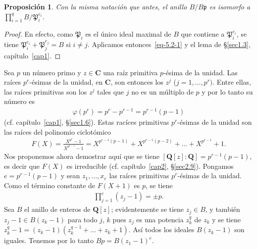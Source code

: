 \documentclass[oneside,bibtotoc,leqno,spanish]{amsbook}
\newcommand{\QQ}{\mathbf{Q}}
\newcommand{\CC}{\mathbf{C}}
\newcommand{\idl}[1]{\mathfrak{#1}}
\numberwithin{equation}{section}
\theoremstyle{defi}
\theoremstyle{note}
\newtheorem{proposition}{Proposici\'on}
\theoremstyle{rem}
\numberwithin{theorem}{section}
\numberwithin{proposition}{section}
\numberwithin{definition}{section}
\numberwithin{lemma}{section}
\numberwithin{corollary}{section}
\numberwithin{example}{section}
\numberwithin{footnote}{section}%
\begin{document}
\begin{proposition}\label{prop5.2.2}
Con la misma notaci\'on que antes, el anillo $B/B\idl{p}$ es isomorfo a $\prod_{i=1}^{q}B/\idl{P}_{i}^{e_{i}}$.
\end{proposition}

\begin{proof}
En efecto, como $\idl{P}_{i}$ es el \'unico ideal maximal de $B$ que contiene a $\idl{P}_{i}^{e_{i}}$, se tiene
$\idl{P}_{i}^{e_{i}}+\idl{P}_{j}^{e_{j}}=B$ si $i\neq j$. Aplicamos entonces~\eqref{eq-5.2-1} y el
lema de \S\ref{sec1.3}, cap\'itulo~\ref{cap1}.
\end{proof}


Sea $p$ un n\'umero primo y $z\in\CC$ una ra\'iz primitiva $p$-\'esima de la unidad. Las ra\'ices $p^{r}$-\'esimas
de la unidad, en $\CC$, son entonces los $z^{j}$ ($j=1,\dots,p^{r})$. Entre ellas, las ra\'ices primitivas son los
$z^{j}$ tales que $j$ no es un m\'ultiplo de $p$ y por lo tanto su n\'umero es
\begin{gather*}
\varphi(p^{r}) = p^{r}-p^{r-1}=p^{r-1}(p-1)
\end{gather*}
(cf. cap\'itulo~\ref{cap1}, \S\ref{sec1.6}). Estas rac\'ices primitivas $p^{r}$-\'esimas de la unidad son las ra\'ices del
polinomio ciclot\'omico
\begin{gather}\label{eq-5.2-3}
F(X) = \frac{X^{p^{r}}-1}{X^{p^{r-1}}-1} = X^{p^{r-1}(p-1)}+X^{p^{r-1}(p-2)}+\dots+X^{p^{r-1}}+1.
\end{gather}
Nos proponemos ahora demostrar aqu\'i que se tiene $[\QQ[z]:\QQ] = p^{r-1}(p-1)$, es decir que $F(X)$ es irreducible
(cf. cap\'itulo~\ref{cap2}, \S\ref{sec2.9}). Pongamos $e=p^{r-1}(p-1)$ y sean $z_{1},\dots,x_{e}$ las ra\'ices primitivas
$p^{r}$-\'esimas de la unidad. Como el t\'ermino constante de $F(X+1)$ es $p$, se tiene
\begin{gather*}
\prod_{j=1}^{e}(z_{j}-1) = \pm p.
\end{gather*}
Sea $B$ el anillo de enteros de $\QQ[z]$; evidentemente se tiene $z_{j}\in B$, y tambi\'en $z_{j}-1\in B(z_{k}-1)$
para todo $j$, $k$ pues $z_{j}$ es una potencia $z_{k}^{q}$ de $z_{k}$ y se tiene $z_{k}^{q}-1=(z_{k}-1)(z_{k}^{q-1}+
\dots+z_{k}+1)$. As\'i todos los ideales $B(z_{k}-1)$ son iguales. Tenemos por lo tanto $Bp = B(z_{1}-1)^{e}$.
\end{document}
